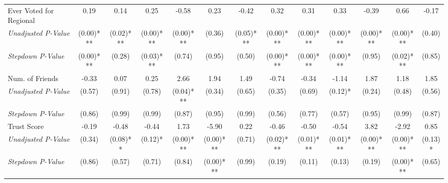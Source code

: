 \begin{tabular}{l c c c c c c c c c c c c}
Ever Voted for Regional & 0.19 & 0.14 & 0.25 & -0.58 & 0.23 & -0.42 & 0.32 & 0.31 & 0.33 & -0.39 & 0.66 & -0.17 \\
\quad \textit{Unadjusted P-Value} & (0.00)*** & (0.02)*** & (0.00)*** & (0.00)*** & (0.36) & (0.05)*** & (0.00)*** & (0.00)*** & (0.00)*** & (0.00)*** & (0.00)*** & (0.40) \\
\quad \textit{Stepdown P-Value} & (0.00)*** & (0.28) & (0.03)*** & (0.74) & (0.95) & (0.50) & (0.00)*** & (0.00)*** & (0.00)*** & (0.95) & (0.02)*** & (0.85) \\
Num. of Friends & -0.33 & 0.07 & 0.25 & 2.66 & 1.94 & 1.49 & -0.74 & -0.34 & -1.14 & 1.87 & 1.18 & 1.85 \\
\quad \textit{Unadjusted P-Value} & (0.57) & (0.91) & (0.78) & (0.04)*** & (0.34) & (0.65) & (0.35) & (0.69) & (0.12)* & (0.24) & (0.48) & (0.56) \\
\quad \textit{Stepdown P-Value} & (0.86) & (0.99) & (0.99) & (0.87) & (0.95) & (0.99) & (0.56) & (0.77) & (0.57) & (0.95) & (0.99) & (0.87) \\
Trust Score & -0.19 & -0.48 & -0.44 & 1.73 & -5.90 & 0.22 & -0.46 & -0.50 & -0.54 & 3.82 & -2.92 & 0.85 \\
\quad \textit{Unadjusted P-Value} & (0.34) & (0.08)** & (0.12)* & (0.00)*** & (0.00)*** & (0.71) & (0.02)*** & (0.01)*** & (0.01)*** & (0.00)*** & (0.00)*** & (0.13)* \\
\quad \textit{Stepdown P-Value} & (0.86) & (0.57) & (0.71) & (0.84) & (0.00)*** & (0.99) & (0.19) & (0.11) & (0.13) & (0.19) & (0.00)*** & (0.65) \\
\bottomrule
\end{tabular}

